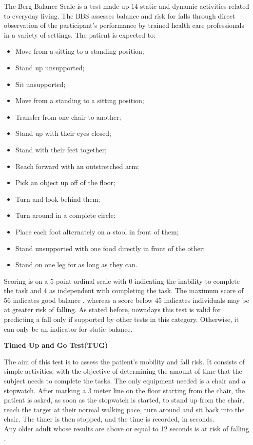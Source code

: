 The Berg Balance Scale is a test made up 14 static and dynamic activities related to everyday living. The BBS assesses balance and risk for falls through direct observation of the participant's performance by trained health care professionals in a variety of settings. The patient is expected to:
\begin{itemize}
\itemsep0cm 
    \item Move from a sitting to a standing position;
    \item Stand up unsupported;
    \item Sit unsupported;
    \item Move from a standing to a sitting position;
    \item Transfer from one chair to another;
    \item Stand up with their eyes closed;
    \item Stand with their feet together;
    \item Reach forward with an outstretched arm;
    \item Pick an object up off of the floor;
    \item Turn and look behind them;
    \item Turn around in a complete circle;
    \item Place each foot alternately on a stool in front of them;
    \item Stand unsupported with one food directly in front of the other;
    \item Stand on one leg for as long as they can.
\end{itemize}
Scoring is on a 5-point ordinal scale with 0 indicating the inability to complete the task and 4 as independent with 
completing the task. The maximum score of 56 indicates good balance \cite{BergBalanceScale}, 
whereas a score below 45 indicates individuals may be at greater risk of falling. As stated before, 
nowadays this test is valid for predicting a fall only if supported by other tests in this category. 
Otherwise, it can only be an indicator for static balance. 

\vspace{0.3cm}
\textbf{Timed Up and Go Test(TUG)}

The aim of this test is to assess the patient's mobility and fall risk.
It consists of simple activities, with the objective of determining the amount of time that the subject needs to complete the tasks. 
The only equipment needed is a chair and a stopwatch.
After marking a 3 meter line on the floor starting from the chair, the patient is asked, as soon as the stopwatch is started, 
to stand up from the chair, reach the target at their normal walking pace, turn around and sit back into the chair.
The timer is then stopped, and the time is recorded, in seconds. 
\\Any older adult whose results are above or equal to 12 seconds is at risk of falling \cite{TUG}.

